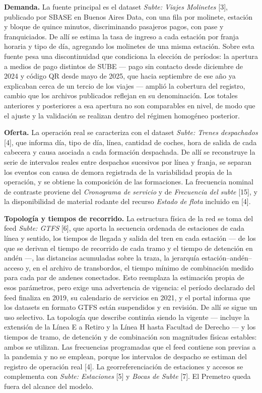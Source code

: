 \documentclass{article}
\begin{document}
\textbf{Demanda.} La fuente principal es el dataset \textit{Subte: Viajes Molinetes} [3], publicado por
SBASE en Buenos Aires Data, con una fila por molinete, estación y bloque de quince minutos, discriminando
pasajeros pagos, con pase y franquiciados. De allí se estima la tasa de ingreso a cada estación por franja
horaria y tipo de día, agregando los molinetes de una misma estación. Sobre esta fuente pesa una
discontinuidad que condiciona la elección de períodos: la apertura a medios de pago distintos de SUBE ---
pago sin contacto desde diciembre de 2024 y código QR desde mayo de 2025, que hacia septiembre de ese año
ya explicaban cerca de un tercio de los viajes --- amplió la cobertura del registro, cambio que los archivos
publicados reflejan en su denominación. Los totales anteriores y posteriores a esa apertura no son
comparables en nivel, de modo que el ajuste y la validación se realizan dentro del régimen homogéneo
posterior.

\textbf{Oferta.} La operación real se caracteriza con el dataset \textit{Subte: Trenes despachados} [4],
que informa día, tipo de día, línea, cantidad de coches, hora de salida de cada cabecera y causa asociada a
cada formación despachada. De allí se reconstruye la serie de intervalos reales entre despachos sucesivos
por línea y franja, se separan los eventos con causa de demora registrada de la variabilidad propia de la
operación, y se obtiene la composición de las formaciones. La frecuencia nominal de contraste proviene del
\textit{Cronograma de servicio} y de \textit{Frecuencia del subte} [15], y la disponibilidad de material
rodante del recurso \textit{Estado de flota} incluido en [4].

\textbf{Topología y tiempos de recorrido.} La estructura física de la red se toma del feed
\textit{Subte: GTFS} [6], que aporta la secuencia ordenada de estaciones de cada línea y sentido, los
tiempos de llegada y salida del tren en cada estación --- de los que se derivan el tiempo de recorrido de
cada tramo y el tiempo de detención en andén ---, las distancias acumuladas sobre la traza, la jerarquía
estación--andén--acceso y, en el archivo de transbordos, el tiempo mínimo de combinación medido para cada
par de andenes conectados. Esto reemplaza la estimación propia de esos parámetros, pero exige una
advertencia de vigencia: el período declarado del feed finaliza en 2019, su calendario de servicios en 2021,
y el portal informa que los datasets en formato GTFS están suspendidos y en revisión. De allí se sigue un
uso selectivo. La topología que describe continúa siendo la vigente --- incluye la extensión de la Línea E a
Retiro y la Línea H hasta Facultad de Derecho --- y los tiempos de tramo, de detención y de combinación son
magnitudes físicas estables: ambos se utilizan. Las frecuencias programadas que el feed contiene son
previas a la pandemia y no se emplean, porque los intervalos de despacho se estiman del registro de
operación real [4]. La
georreferenciación de estaciones y accesos se complementa con \textit{Subte: Estaciones} [5] y
\textit{Bocas de Subte} [7]. El Premetro queda fuera del alcance del modelo.
\end{document}
